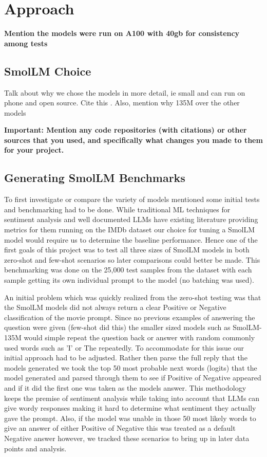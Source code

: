 \documentclass[10pt,twocolumn,letterpaper]{article}
\begin{document}
\section{Approach}

\textbf{Mention the models were run on A100 with 40gb for consistency among tests}


\subsection{SmolLM Choice}
Talk about why we chose the models in more detail, ie small and can run on phone and open source. Cite this \cite{hf-smollm-usecase}.
Also, mention why 135M over the other models

\textbf{Important: Mention any code repositories (with citations) or other sources that you used, and specifically what changes you made to them for your project. }



\subsection{Generating SmolLM Benchmarks}
To first investigate or compare the variety of models mentioned some initial tests and benchmarking had to be done. While traditional ML techniques for sentiment analysis and well documented LLMs have existing literature providing metrics for them running on the IMDb dataset \cite{IMDB-dataset} our choice for tuning a SmolLM model would require us to determine the baseline performance. Hence one of the first goals of this project was to test all three sizes of SmolLM models in both zero-shot and few-shot scenarios so later comparisons could better be made. This benchmarking was done on the 25,000 test samples from the dataset with each sample getting its own individual prompt to the model (no batching was used). 

An initial problem which was quickly realized from the zero-shot testing was that the SmolLM models did not always return a clear Positive or Negative classification of the movie prompt. Since no previous examples of answering the question were given (few-shot did this) the smaller sized models such as SmolLM-135M would simple repeat the question back or answer with random commonly used words such as 'I' or The repeatedly. To accommodate for this issue our initial approach had to be adjusted. Rather then parse the full reply that the models generated we took the top 50 most probable next words (logits) that the model generated and parsed through them to see if Positive of Negative appeared and if it did the first one was taken as the models answer. This methodology keeps the premise of sentiment analysis while taking into account that LLMs can give wordy responses making it hard to determine what sentiment they actually gave the prompt. Also, if the model was unable in those 50 most likely words to give an answer of either Positive of Negative this was treated as a default Negative answer however, we tracked these scenarios to bring up in later data points and analysis. 
\end{document}
